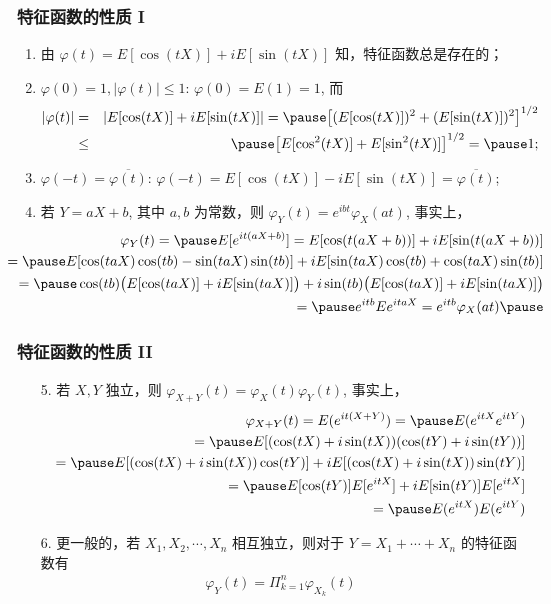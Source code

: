 \begin{frame}%
	\frametitle{特征函数的性质 I}
	\begin{enumerate}[<+-|alert@+>]
		\item  由 $\varphi (t)=E[\cos (tX)]+iE[\sin (tX)]$ 知，特征函数总是存在的；
		\item $\varphi (0)=1, |\varphi (t)|\le 1$: $\varphi (0)=E (1)=1$, 而
		\begin{eqnarray*}
			|\varphi(t)|&=&|E[\cos(tX)]+iE[\sin(tX)]|=\pause \big[(E[\cos(tX)])^2+(E[\sin(tX)])^2\big]^{1/2}\\
			&\le&\pause \big[E[\cos^2(tX)]+E[\sin^2(tX)]\big]^{1/2}=\pause 1;
		\end{eqnarray*}
		\item $\varphi(-t)=\overline{\varphi(t)}$: $\varphi(-t)=E[\cos(tX)]-iE[\sin(tX)]=\overline{\varphi(t)}$;
		\item  若 $Y=aX+b$, 其中 $a,b$ 为常数，则 $\varphi_Y (t)=e^{ibt}\varphi_X (at)$, 事实上，
		{\small\begin{eqnarray*}
				&&\hspace{-1.2cm}\varphi_Y(t)=\pause E[e^{it(aX+b)}]=E[\cos(t(aX+b))]+iE[\sin(t(aX+b))]\\
				&&\hspace{-1.2cm}=\pause E[\cos(taX)\cos(tb)-\sin(taX)\sin(tb)]+iE[\sin(taX)\cos(tb)+\cos(taX)\sin(tb)]\\
				&&\hspace{-1.2cm}=\pause \cos(tb)\big(E[\cos(taX)]+iE[\sin(taX)]\big)+i\sin(tb)\big(E[\cos(taX)]+iE[\sin(taX)]\big)\\
				&&\hspace{-1.2cm}=\pause  e^{itb}Ee^{itaX}=e^{itb}\varphi_X(at)\pause
		\end{eqnarray*}}
	\end{enumerate}
\end{frame}
\begin{frame}
	\frametitle{特征函数的性质 II}

	\begin{enumerate}[<+-|alert@+>]
		\item[5.] 若 $X,Y$ 独立，则 $\varphi_{X+Y}(t)=\varphi_X (t)\varphi_Y (t)$, 事实上，
		\begin{eqnarray*}
			&&\varphi_{X+Y}(t)=E(e^{it(X+Y)})=\pause E(e^{itX}e^{itY})\\
			&&=\pause E[(\cos(tX)+i\sin(tX))(\cos(tY)+i\sin(tY))]\\
			&&=\pause E[(\cos(tX)+i\sin(tX))\cos(tY)]+iE[(\cos(tX)+i\sin(tX))\sin(tY)]\\
			&&=\pause E[\cos(tY)]E[e^{itX}]+iE[\sin(tY)]E[e^{itX}]\\
			&&=\pause E(e^{itX})E(e^{itY})
		\end{eqnarray*}\pause
		\item[6.] 更一般的，若 $X_1,X_2,\cdots,X_n$ 相互独立，则对于 $Y=X_1+\cdots+X_n$ 的特征函数有
		\begin{eqnarray*}
			\varphi_Y(t)=\Pi_{k=1}^n\varphi_{X_k}(t)
		\end{eqnarray*}
	\end{enumerate}
\end{frame}
